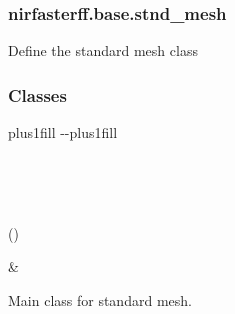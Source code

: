 \documentclass[letterpaper,10pt,english]{sphinxmanual}
\begin{document}
\sphinxstepscope


\subsubsection{nirfasterff.base.stnd\_mesh}
\label{\detokenize{_autosummary/nirfasterff.base.stnd_mesh:module-nirfasterff.base.stnd_mesh}}\label{\detokenize{_autosummary/nirfasterff.base.stnd_mesh:nirfasterff-base-stnd-mesh}}\label{\detokenize{_autosummary/nirfasterff.base.stnd_mesh::doc}}
\sphinxAtStartPar
Define the standard mesh class
\subsubsection*{Classes}


\begin{savenotes}
\sphinxatlongtablestart
\sphinxthistablewithglobalstyle
\sphinxthistablewithnovlinesstyle
\makeatletter
  \LTleft \@totalleftmargin plus1fill
  \LTright\dimexpr\columnwidth-\@totalleftmargin-\linewidth\relax plus1fill
\makeatother
\begin{longtable}{}
\sphinxtoprule
\endfirsthead

\\
\sphinxtoprule
\endhead

\sphinxbottomrule
{}\\
\endfoot

\endlastfoot
\sphinxtableatstartofbodyhook
\begin{varwidth}[t]{}
\sphinxAtStartPar
{\hyperref[\detokenize{_autosummary/nirfasterff.base.stnd_mesh.stndmesh:nirfasterff.base.stnd_mesh.stndmesh}]{}}()
\sphinxbeforeendvarwidth
\end{varwidth}%
&\begin{varwidth}[t]{}
\sphinxAtStartPar
Main class for standard mesh.
\sphinxbeforeendvarwidth
\end{varwidth}%
\\
\sphinxbottomrule
\end{longtable}
\sphinxtableafterendhook
\sphinxatlongtableend
\end{savenotes}
\end{document}
